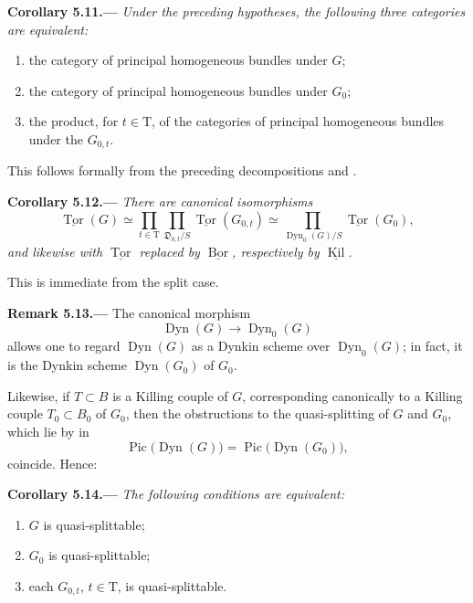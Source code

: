 \par\medskip\noindent{}\textbf{Corollary 5.11.---}\enspace
\emph{Under the preceding hypotheses, the following three categories
are equivalent:}
\begin{enumerate}
\item[(i)] the category of principal homogeneous bundles under \(G\);
\item[(ii)] the category of principal homogeneous bundles under \(G_0\);
\item[(iii)] the product, for \(t\in\mathrm T\), of the categories of
principal homogeneous bundles under the \(G_{0,t}\).
\end{enumerate}
This follows formally from the preceding decompositions and .

\par\medskip\noindent{}\textbf{Corollary 5.12.---}\enspace
\emph{There are canonical isomorphisms}
\[
  \underline{\operatorname{Tor}}(G)
  \simeq
  \prod_{t\in\mathrm T}
  \prod_{\mathfrak D_{0,t}/S}
    \underline{\operatorname{Tor}}(G_{0,t})
  \simeq
  \prod_{\operatorname{Dyn}_0(G)/S}
    \underline{\operatorname{Tor}}(G_0),
\]
\emph{and likewise with \(\underline{\operatorname{Tor}}\) replaced
by \(\underline{\operatorname{Bor}}\), respectively by
\(\underline{\operatorname{Kil}}\).}

This is immediate from the split case.

\par\medskip\noindent{}\textbf{Remark 5.13.---}\enspace
The canonical morphism
\[
  \operatorname{Dyn}(G)\longrightarrow\operatorname{Dyn}_0(G)
\]
allows one to regard \(\operatorname{Dyn}(G)\) as a Dynkin scheme over
\(\operatorname{Dyn}_0(G)\); in fact, it is the Dynkin scheme
\(\operatorname{Dyn}(G_0)\) of \(G_0\).

Likewise, if \(T\subset B\) is a Killing couple of \(G\), corresponding
canonically to a Killing couple \(T_0\subset B_0\) of \(G_0\), then the
obstructions to the quasi-splitting of \(G\) and \(G_0\), which lie by
 in
\[
  \operatorname{Pic}\bigl(\operatorname{Dyn}(G)\bigr)
  =
  \operatorname{Pic}\bigl(\operatorname{Dyn}(G_0)\bigr),
\]
coincide.  Hence:

\par\medskip\noindent{}\textbf{Corollary 5.14.---}\enspace
\emph{The following conditions are equivalent:}
\begin{enumerate}
\item[(i)] \(G\) is quasi-splittable;
\item[(ii)] \(G_0\) is quasi-splittable;
\item[(iii)] each \(G_{0,t}\), \(t\in\mathrm T\), is quasi-splittable.
\end{enumerate}

